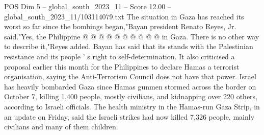 \begin{textsample}{POS Dim 5 – global\_south\_2023\_11 – Score 12.00 – global\_south\_2023\_11/103114079.txt}
The situation in Gaza has reached its worst so far since the bombings began,"Bayan president Renato Reyes, Jr. said."Yes, the Philippine @ @ @ @ @ @ @ @ @ @ in Gaza.
There is no other way to describe it,"Reyes added.
Bayan has said that its stands with the Palestinian resistance and its people ' s right to self-determination.
It also criticised a proposal earlier this month for the Philippines to declare Hamas a terrorist organisation, saying the Anti-Terrorism Council does not have that power.
Israel has heavily bombarded Gaza since Hamas gunmen stormed across the border on October 7, killing 1,400 people, mostly civilians, and kidnapping over 220 others, according to Israeli officials.
The health ministry in the Hamas-run Gaza Strip, in an update on Friday, said the Israeli strikes had now killed 7,326 people, mainly civilians and many of them children.

\end{textsample}
